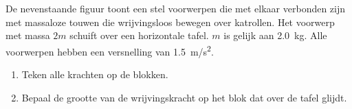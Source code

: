 


\item{}\begin{minipage}[t]{.6\linewidth}
	 De nevenstaande figuur toont een stel voorwerpen die met elkaar verbonden zijn met massaloze touwen die wrijvingsloos bewegen over katrollen. Het voorwerp met massa $2m$ schuift over een horizontale tafel. $m$ is gelijk aan \SI{2,0}{kg}. Alle voorwerpen hebben een versnelling van \SI{1,5}{m/s^2}. 
\end{minipage}
\hfill
\begin{minipage}[t]{.37\linewidth}
\end{minipage}

\begin{enumerate}
	\item Teken alle krachten op de blokken.
	\item Bepaal de grootte van de wrijvingskracht op het blok dat over de tafel glijdt.
\end{enumerate}



\begin{oplossing}
	
\end{oplossing}